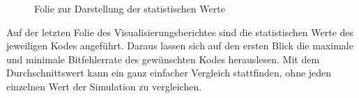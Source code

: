 \begin{figure}[th]
\centering
{}
\caption{Folie zur Darstellung der statistischen Werte}
\label{pic:ChannelcodingSimulationStatistic}
\end{figure}

Auf der letzten Folie des Visualisierungsberichtes sind die statistischen Werte des jeweiligen Kodes angeführt. Daraus lassen sich auf den ersten Blick die maximale und minimale Bitfehlerrate des gewünschten Kodes herauslesen. Mit dem Durchschnittswert kann ein ganz einfacher Vergleich stattfinden, ohne jeden einzelnen Wert der Simulation zu vergleichen.

\FloatBarrier